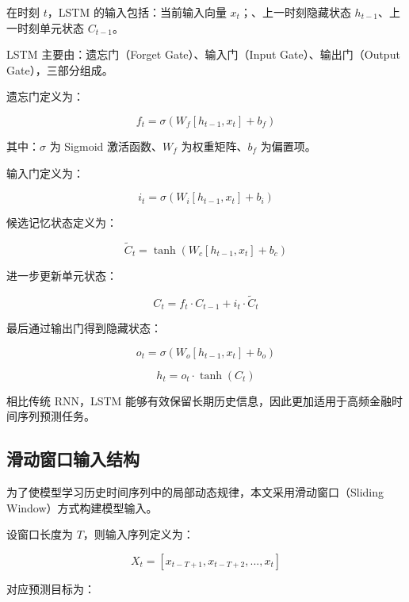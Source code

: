 \documentclass[withoutpreface,bwprint]{cumcmthesis}
\begin{document}
在时刻 $t$，LSTM 的输入包括：当前输入向量 $x_t$；、上一时刻隐藏状态 $h_{t-1}$、上一时刻单元状态 $C_{t-1}$。

LSTM 主要由：遗忘门（Forget Gate）、输入门（Input Gate）、输出门（Output Gate），三部分组成。

遗忘门定义为：

\begin{equation}
f_t=\sigma(W_f[h_{t-1},x_t]+b_f)
\end{equation}

其中：$\sigma$ 为 Sigmoid 激活函数、$W_f$ 为权重矩阵、$b_f$ 为偏置项。

输入门定义为：

\begin{equation}
i_t=\sigma(W_i[h_{t-1},x_t]+b_i)
\end{equation}

候选记忆状态定义为：

\begin{equation}
\tilde{C}_t=\tanh(W_c[h_{t-1},x_t]+b_c)
\end{equation}

进一步更新单元状态：

\begin{equation}
C_t=f_t\cdot C_{t-1}+i_t\cdot \tilde{C}_t
\end{equation}

最后通过输出门得到隐藏状态：

\begin{equation}
o_t=\sigma(W_o[h_{t-1},x_t]+b_o)
\end{equation}

\begin{equation}
h_t=o_t\cdot \tanh(C_t)
\end{equation}

相比传统 RNN，LSTM 能够有效保留长期历史信息，因此更加适用于高频金融时间序列预测任务。

\subsection{滑动窗口输入结构}

为了使模型学习历史时间序列中的局部动态规律，本文采用滑动窗口（Sliding Window）方式构建模型输入。

设窗口长度为 $T$，则输入序列定义为：

\begin{equation}
X_t=[x_{t-T+1},x_{t-T+2},...,x_t]
\end{equation}

对应预测目标为：
\end{document}
